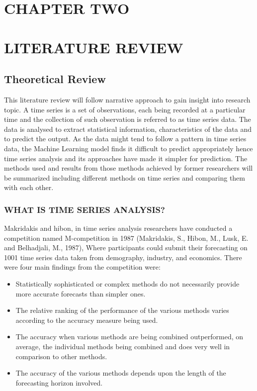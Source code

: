 \documentclass[12pt,a4paper]{article}
\begin{document}
\begin{flushleft}
		\section{CHAPTER  TWO}
		\section{LITERATURE REVIEW}
		\subsection{Theoretical Review}
		This literature review will follow narrative approach to gain insight into research topic. A time series is a set of observations, each being recorded at a particular time and the collection of such observation is referred to as time series data. The data is analysed to extract statistical information, characteristics of the data and to predict the output. As the data might tend to follow a pattern in time series data, the Machine Learning model finds it difficult to predict appropriately hence time series analysis and its approaches have made it simpler for prediction. The methods used and results from those methods achieved by former researchers will be summarized including different methods on time series and comparing them with each other.
		
		\subsubsection{WHAT IS TIME SERIES ANALYSIS?}
		
		Makridakis and hibon, in time series analysis researchers have conducted a competition named M-competition in 1987 (Makridakis, S., Hibon, M., Lusk, E. and Belhadjali, M., 1987), Where participants could submit their forecasting on 1001 time series data taken from demography, industry, and economics. There were four main findings from the competition were:\\
		\begin{itemize}
		\item	Statistically sophisticated or complex methods do not necessarily provide more accurate forecasts than simpler ones.
		\item	The relative ranking of the performance of the various methods varies according to the accuracy measure being used.
		\item	The accuracy when various methods are being combined outperformed, on average, the individual methods being combined and does very well in comparison to other methods.
		\item	The accuracy of the various methods depends upon the length of the forecasting horizon involved.
		\end{itemize}
		

\end{flushleft}
\end{document}
